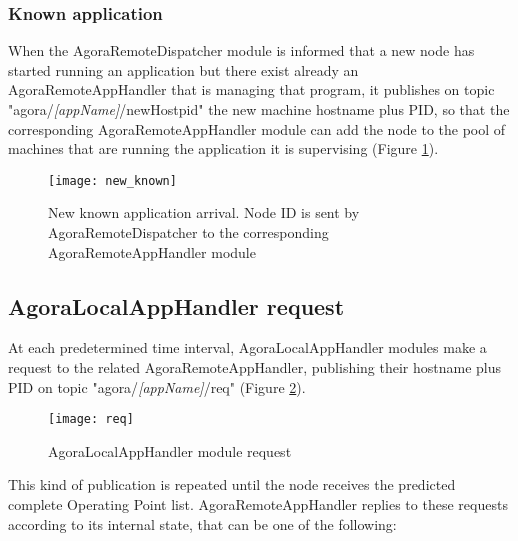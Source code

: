 \subsubsection{Known application}\label{knownApp}

When the AgoraRemoteDispatcher module is informed that a new node has started running an application but there exist already an AgoraRemoteAppHandler that is managing that program, it publishes on topic "agora\slash{}\textit{[app\-Name]}\slash{}newHostpid" the new machine hostname plus PID, so that the corresponding Agora\-Remote\-App\-Handler module can add the node to the pool of machines that are running the application it is supervising (Figure \ref{fig::knownApp}).

\begin{figure}[ht]

    \centering
    \texttt{[image: new\_known]}
    \caption[New known application arrival]{New known application arrival. Node ID is sent by AgoraRemoteDispatcher to the corresponding AgoraRemoteAppHandler module}

    \label{fig::knownApp}
    
\end{figure}





\subsection{AgoraLocalAppHandler request}\label{clientReq}

At each predetermined time interval, AgoraLocalAppHandler modules make a request to the related AgoraRemoteAppHandler, publishing their hostname plus PID on topic "agora/\textit{[appName]}/req" (Figure \ref{fig::localReq}).

\begin{figure}[hb]

    \centering
    \texttt{[image: req]}
    \caption{AgoraLocalAppHandler module request}

    \label{fig::localReq}
    
\end{figure}

This kind of publication is repeated until the node receives the predicted complete Operating Point list. AgoraRemoteAppHandler replies to these requests according to its internal state, that can be one of the following:

